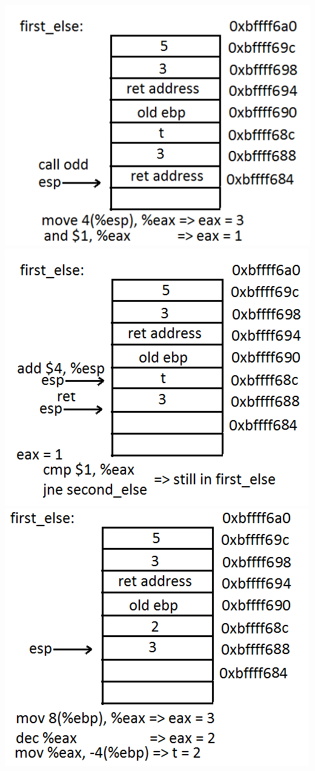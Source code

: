 \documentclass{article}
\begin{document}
\includegraphics[scale=0.5]{stack4.png}\\
\includegraphics[scale=0.5]{stack5.png}
\includegraphics[scale=0.5]{stack6.png}\\
\end{document}
